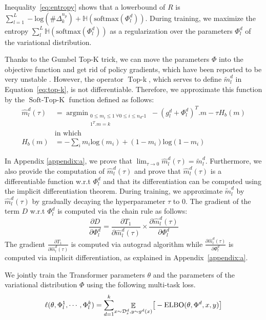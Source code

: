 \documentclass[11pt]{article}
\newcommand{\fyDone}[1]{\done[FY]\Todo[FY:]{\textcolor{orange}{#1}}}
\begin{document}
Inequality~\eqref{eq:entropy} shows that a lowerbound of $R$ is $\displaystyle{\mathop{\sum}_{l=1}^L} -\text{log}(\#\Delta^{n_p}_k) + \mathbb{H}(\text{softmax}(\Phi_l^d))$. During training, we maximize the entropy $\displaystyle{\mathop{\sum}_{l}^L} \mathbb{H}(\text{softmax}(\Phi_l^d))$ as a regularization over the parameters $\Phi_l^d$ of the variational distribution.

Thanks to the Gumbel Top-K trick, we can move the parameters $\Phi$ into the objective function and get rid of policy gradients, which have been reported to be very unstable \citep{Diederick14auto}. However, the operator $\operatorname{Top-k}$, which serves to define $\tilde{m}_l^d$ in Equation~\eqref{eq:top-k}, is not differentiable. Therefore, we approximate this function by the $\operatorname{Soft-Top-K}$ function defined as follows:
\begin{align}
\hat{m}_l^d(\tau) &= \displaystyle{\mathop{argmin}_{\substack{
       0 \leqslant m_i \leqslant 1 \ \forall 0 \leqslant i \leqslant n_d\text{-}1 \label{eq:soft-top-k}\\
        1^{T}.m = k
      }}} -(g_l^d+\Phi_l^d)^{T} . m - \tau H_b(m) \\
& \text{in which} \nonumber \\
H_b(m) &= - \sum_i m_i \text{log}(m_i) + (1-m_i)\text{log}(1-m_i) \nonumber 
\end{align}

In Appendix \ref{appendix:a}, we prove that $\lim_{\tau \rightarrow 0}\hat{m}_l^d(\tau) = \tilde{m}_l^d$. Furthermore, we also provide the computation of $\hat{m}_l^d(\tau)$ and prove that $\hat{m}_l^d(\tau)$ is a differentiable function w.r.t $\Phi_l^d$ and that its differentiation can be computed using the implicit differentiation theorem. During training, we approximate $\tilde{m}_l^d$ by $\hat{m}_l^d(\tau)$ by gradually decaying the hyperparameter $\tau$ to $0$. The gradient of the term $D$ w.r.t $\Phi_l^d$ is computed via the chain rule as follows:
\begin{equation}
\frac{\partial D}{\partial \Phi_l^d} = \frac{\partial T_1}{\partial \hat{m}_l^d(\tau)} \times \frac{\partial \hat{m}_l^d(\tau)}{\partial \Phi_l^d}
\end{equation}
The gradient $\frac{\partial T_1}{\partial \hat{m}_l^d(\tau)}$ is computed via autograd algorithm while $\frac{\partial \hat{m}_l^d(\tau)}{\partial \Phi_l^d}$ is computed via implicit differentiation, as explained in Appendix~\ref{appendix:a}.

We jointly train the Transformer parameters $\theta$ and the parameters of the variational distribution $\Phi$ using the following multi-task loss.\fyDone{This is repeated}
\begin{align}
\hspace{-0.em}
\ell(\theta,\Phi_l^1,\cdots,\Phi_l^k) = \displaystyle{\mathop{\sum}_{d=1}^{k}} \displaystyle{\mathop{\mathbb{E}}_{x \sim \mathcal{D}_s^d,y \sim g^d(x)}} \big[-\operatorname{ELBO}(\theta,\Phi^d,x,y)\big]
\end{align}
\end{document}
